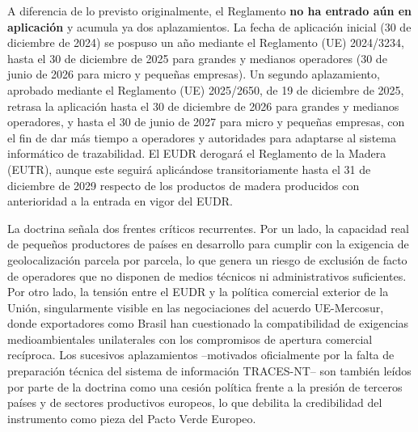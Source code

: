 \documentclass[10pt,a4paper]{article}
\begin{document}
A diferencia de lo previsto originalmente, el Reglamento \textbf{no ha entrado aún en aplicación} y acumula ya dos aplazamientos. La fecha de aplicación inicial (30 de diciembre de 2024) se pospuso un año mediante el Reglamento (UE) 2024/3234, hasta el 30 de diciembre de 2025 para grandes y medianos operadores (30 de junio de 2026 para micro y pequeñas empresas). Un segundo aplazamiento, aprobado mediante el Reglamento (UE) 2025/2650, de 19 de diciembre de 2025, retrasa la aplicación hasta el 30 de diciembre de 2026 para grandes y medianos operadores, y hasta el 30 de junio de 2027 para micro y pequeñas empresas, con el fin de dar más tiempo a operadores y autoridades para adaptarse al sistema informático de trazabilidad. El EUDR derogará el Reglamento de la Madera (EUTR), aunque este seguirá aplicándose transitoriamente hasta el 31 de diciembre de 2029 respecto de los productos de madera producidos con anterioridad a la entrada en vigor del EUDR.

La doctrina señala dos frentes críticos recurrentes. Por un lado, la capacidad real de pequeños productores de países en desarrollo para cumplir con la exigencia de geolocalización parcela por parcela, lo que genera un riesgo de exclusión de facto de operadores que no disponen de medios técnicos ni administrativos suficientes. Por otro lado, la tensión entre el EUDR y la política comercial exterior de la Unión, singularmente visible en las negociaciones del acuerdo UE-Mercosur, donde exportadores como Brasil han cuestionado la compatibilidad de exigencias medioambientales unilaterales con los compromisos de apertura comercial recíproca. Los sucesivos aplazamientos --motivados oficialmente por la falta de preparación técnica del sistema de información TRACES-NT-- son también leídos por parte de la doctrina como una cesión política frente a la presión de terceros países y de sectores productivos europeos, lo que debilita la credibilidad del instrumento como pieza del Pacto Verde Europeo.





\clearpage
\end{document}
